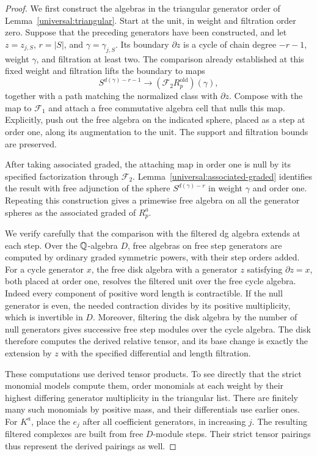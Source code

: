 \begin{proof}
We first construct the algebras in the triangular generator order
of Lemma~\ref{universal:triangular}. Start at the unit, in weight
and filtration order zero. Suppose that the preceding generators
have been constructed, and let $z=z_{j,S}$, $r=|S|$, and
$\gamma=\gamma_{j,S}$. Its boundary $\partial z$ is a cycle of
chain degree $-r-1$, weight $\gamma$, and filtration at least two.
The comparison already established at this fixed weight and
filtration lifts the boundary to maps
\begin{equation}\label{universal:attaching-map}
 S^{d(\gamma)-r-1}
    \longrightarrow(\mathcal F_2R_p^{\mathrm{old}})(\gamma),
\end{equation}
together with a path matching the normalized class with
$\partial z$. Compose with the map to $\mathcal F_1$ and attach
a free commutative algebra cell that nulls this map. Explicitly,
push out the free algebra on the indicated sphere, placed as
a step at order one, along its augmentation to the unit.
The support and filtration bounds are preserved.

After taking associated graded, the attaching map in order one
is null by its specified factorization through $\mathcal F_2$.
Lemma~\ref{universal:associated-graded} identifies the result
with free adjunction of the sphere
$S^{d(\gamma)-r}$ in weight $\gamma$ and order one. Repeating
this construction gives a primewise free algebra on all the
generator spheres as the associated graded of $R_p^a$.

We verify carefully that the comparison with the filtered dg
algebra extends at each step. Over the $\mathbb Q$-algebra $D$, free
algebras on free step generators are computed by ordinary
graded symmetric powers, with their step orders added. For
a cycle generator $x$, the free disk algebra with a generator
$z$ satisfying $\partial z=x$, both placed at order one,
resolves the filtered unit over the free cycle algebra.
Indeed every component of positive word length is
contractible. If the null generator is even, the needed
contraction divides by its positive multiplicity, which is
invertible in $D$. Moreover, filtering the disk algebra by
the number of null generators gives successive free step
modules over the cycle algebra. The disk therefore computes
the derived relative tensor, and its base change is exactly
the extension by $z$ with the specified differential and
length filtration.

These computations use derived tensor products. To see
directly that the strict monomial models compute them,
order monomials at each weight by their highest differing
generator multiplicity in the triangular list. There are
finitely many such monomials by positive mass, and their
differentials use earlier ones. For $K^a$, place the $e_j$
after all coefficient generators, in increasing $j$.
The resulting filtered complexes are built from free
$D$-module steps. Their strict tensor pairings thus
represent the derived pairings as well.


\end{proof}
